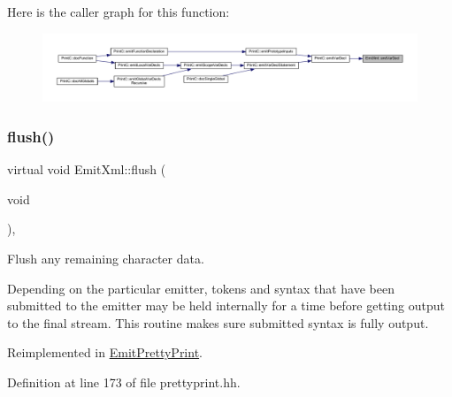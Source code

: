 Here is the caller graph for this function\+:
\nopagebreak
\begin{figure}[H]
\begin{center}
\leavevmode
\includegraphics[width=350pt]{class_emit_xml_a8700bdf9d4e073ae392ef722f53ceb45_icgraph}
\end{center}
\end{figure}
\mbox{\label{class_emit_xml_a4266748416715606d0028e2aec90dce8}} 
\subsubsection{\texorpdfstring{flush()}{flush()}}
{\footnotesize\ttfamily virtual void Emit\+Xml\+::flush (\begin{DoxyParamCaption}\item[{void}]{ }\end{DoxyParamCaption})\hspace{0.3cm}{\ttfamily [inline]}, {\ttfamily [virtual]}}



Flush any remaining character data. 

Depending on the particular emitter, tokens and syntax that have been submitted to the emitter may be held internally for a time before getting output to the final stream. This routine makes sure submitted syntax is fully output. 

Reimplemented in \mbox{\hyperlink{class_emit_pretty_print_a4537a56174d63dfc806c8b599181723b}{Emit\+Pretty\+Print}}.



Definition at line 173 of file prettyprint.\+hh.

